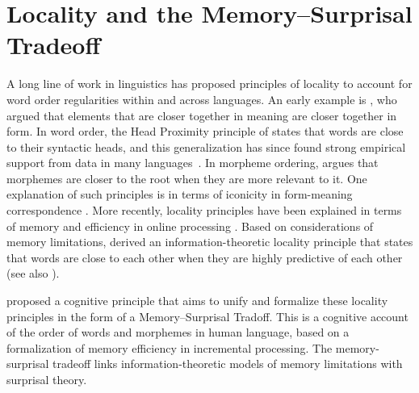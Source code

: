 \documentclass[11pt,letterpaper]{article}
\begin{document}








\section{Locality and the Memory--Surprisal Tradeoff}

A long line of work in linguistics has proposed principles of locality to account for word order regularities within and across languages.
An early example is \citep{behaghel1932deutsche}, who argued that elements that are closer together in meaning are closer together in form.
In word order, the Head Proximity principle of \citep{rijkhoff-word-1986} states that words are close to their syntactic heads, and this generalization has since found strong empirical support from data in many languages~\cite[e.g.][]{liu2008dependency, futrell-large-scale-2015-1, liu-dependency-2017}.
In morpheme ordering, \citep{bybee-morphology-1985} argues that morphemes are closer to the root when they are more relevant to it.
One explanation of such principles is in terms of iconicity in form-meaning correspondence \citep{givon1985iconicity}.
More recently, locality principles have been explained in terms of memory and efficiency in online processing \citep{hawkins-efficiency-2003}.
Based on considerations of memory limitations, \citet{futrell-noisy-context-2017} derived an information-theoretic locality principle that states that words are close to each other when they are highly predictive of each other (see also \citet{culbertson2020from}).


\citet{Hahn2020modeling} proposed a cognitive principle that aims to unify and formalize these locality principles in the form of a Memory--Surprisal Tradoff.
This is a cognitive account of the order of words and morphemes in human language, based on a formalization of memory efficiency in incremental processing.
The memory-surprisal tradeoff links information-theoretic models of memory limitations with surprisal theory.
\end{document}
